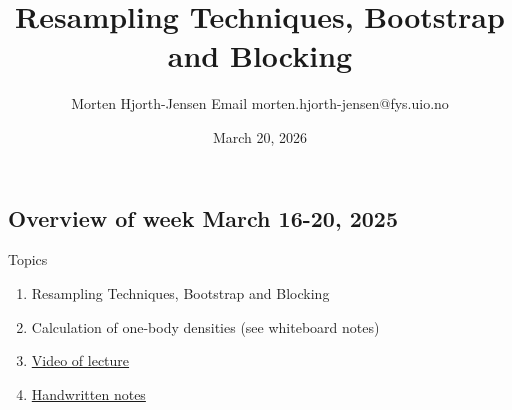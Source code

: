 \documentclass[%
oneside,                 %
final,                   %
10pt]{article}
\begin{document}

\newcommand{\exercisesection}[1]{\subsection*{#1}}






\title{Resampling Techniques, Bootstrap and Blocking}


\author{Morten Hjorth-Jensen  Email morten.hjorth-jensen@fys.uio.no}

\date{March 20, 2026
}

\subsection{Overview of week March 16-20, 2025}
\begin{block}{Topics }
\begin{enumerate}
\item Resampling Techniques, Bootstrap and Blocking 

\item Calculation of one-body densities (see whiteboard notes)

\item \href{{https://youtu.be/cnPh5FuGf3o}}{Video of lecture}

\item \href{{https://github.com/CompPhysics/ComputationalPhysics2/blob/gh-pages/doc/HandWrittenNotes/2025/NotesMarch21.pdf}}{Handwritten notes}
\end{enumerate}

\noindent
\end{block}

\end{document}
